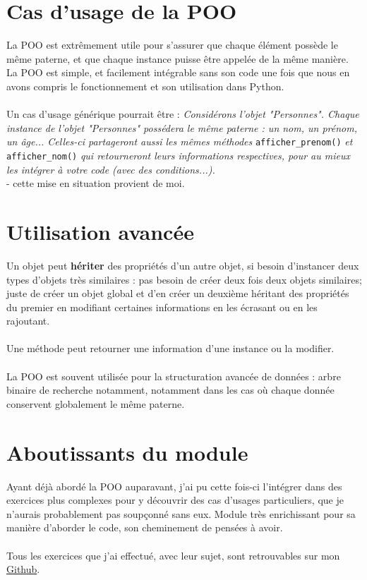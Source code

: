 \section{Cas d'usage de la POO}

La POO est extrêmement utile pour s'assurer que chaque élément possède le même paterne, et que chaque instance puisse être appelée de la même manière. La POO est simple, et facilement intégrable sans son code une fois que nous en avons compris le fonctionnement et son utilisation dans Python.
\\ \\
Un cas d'usage générique pourrait être : \textit{Considérons l'objet "Personnes". Chaque instance de l'objet "Personnes" possédera le même paterne : un nom, un prénom, un âge... Celles-ci partageront aussi les mêmes méthodes} \verb|afficher_prenom()| \textit{et} \verb|afficher_nom()| \textit{qui retourneront leurs informations respectives, pour au mieux les intégrer à votre code (avec des conditions...).}\\- cette mise en situation provient de moi.

\section{Utilisation avancée}

 Un objet peut \textbf{hériter} des propriétés d'un autre objet, si besoin d'instancer deux types d'objets très similaires : pas besoin de créer deux fois deux objets similaires; juste de créer un objet global et d'en créer un deuxième héritant des propriétés du premier en modifiant certaines informations en les écrasant ou en les rajoutant.
 \\ \\
 Une méthode peut retourner une information d'une instance ou la modifier.
 \\ \\
 La POO est souvent utilisée pour la structuration avancée de données : arbre binaire de recherche notamment, notamment dans les cas où chaque donnée conservent globalement le même paterne.

 \section{Aboutissants du module}

 Ayant déjà abordé la POO auparavant, j'ai pu cette fois-ci l'intégrer dans des exercices plus complexes pour y découvrir des cas d'usages particuliers, que je n'aurais probablement pas soupçonné sans eux. Module très enrichissant pour sa manière d'aborder le code, son cheminement de pensées à avoir.
 \\ \\
 Tous les exercices que j'ai effectué, avec leur sujet, sont retrouvables sur mon \href{https://github.com/xeylou/r308}{Github}.